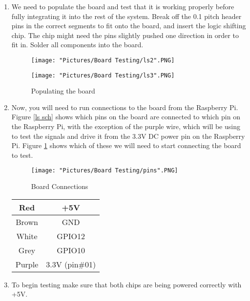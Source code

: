\documentclass[12pt]{article}
\begin{document}
\begin{enumerate}

	\item We need to populate the board and test that it is working properly before fully integrating it into the rest of the system. Break off the 0.1 pitch header pins in the correct segments to fit onto the board, and insert the logic shifting chip. The chip might need the pins slightly pushed one direction in order to fit in. Solder all components into the board.

\begin{figure}[H]
 	\centering
  	\begin{minipage}[b]{0.45\textwidth}
		\texttt{[image: "Pictures/Board Testing/ls2".PNG]}
  	\end{minipage}
  	\hfill
  	\begin{minipage}[b]{0.45\textwidth}
    		\texttt{[image: "Pictures/Board Testing/ls3".PNG]}
  	\end{minipage}
	\caption{Populating the board}
\end{figure}

	\item Now, you will need to run connections to the board from the Raspberry Pi. Figure \ref{ls sch} shows which pins on the board are connected to which pin on the Raspberry Pi, with the exception of the purple wire, which will be using to test the signals and drive it from the 3.3V DC power pin on the Raspberry Pi. Figure \ref{ls4} shows which of these we will need to start connecting the board to test.

\begin{figure}[H]
  	\centering
    	\texttt{[image: "Pictures/Board Testing/pins".PNG]}
 	\caption{Board Connections}
	\label{ls4}
\end{figure}

\begin{center}
\begin{tabular}[2]{| c | c |}	
	\hline
	Red & +5V \\ \hline
	Brown & GND \\ \hline
	White & GPIO12 \\ \hline
	Grey & GPIO10 \\ \hline
	Purple & 3.3V (pin\#01) \\ \hline
\end{tabular}	
\end{center}

	\item To begin testing make sure that both chips are being powered correctly with +5V.
	

\end{enumerate}
\end{document}
